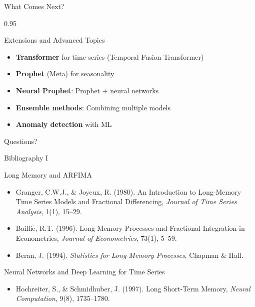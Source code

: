 \documentclass[9pt, aspectratio=169, t]{beamer}
\begin{document}
\begin{frame}{What Comes Next?}
    \begin{cminipage}{0.95\textwidth}
    \begin{block}{Extensions and Advanced Topics}
        \begin{itemize}\setlength{\itemsep}{0pt}
            \item \textbf{Transformer} for time series (Temporal Fusion Transformer)
            \item \textbf{Prophet} (Meta) for seasonality
            \item \textbf{Neural Prophet}: Prophet + neural networks
            \item \textbf{Ensemble methods}: Combining multiple models
            \item \textbf{Anomaly detection} with ML
        \end{itemize}
    \end{block}

    \vspace{0.1cm}

    \begin{center}
        \Large\textcolor{MainBlue}{Questions?}
    \end{center}
    \end{cminipage}
\end{frame}


\begin{frame}{Bibliography I}
    \begin{block}{Long Memory and ARFIMA}
        {\small
        \begin{itemize}\setlength{\itemsep}{0pt}
            \item Granger, C.W.J., \& Joyeux, R. (1980). An Introduction to Long-Memory Time Series Models and Fractional Differencing, \textit{Journal of Time Series Analysis}, 1(1), 15--29.
            \item Baillie, R.T. (1996). Long Memory Processes and Fractional Integration in Econometrics, \textit{Journal of Econometrics}, 73(1), 5--59.
            \item Beran, J. (1994). \textit{Statistics for Long-Memory Processes}, Chapman \& Hall.
        \end{itemize}
        }
    \end{block}

    \begin{exampleblock}{Neural Networks and Deep Learning for Time Series}
        {\small
        \begin{itemize}\setlength{\itemsep}{0pt}
            \item Hochreiter, S., \& Schmidhuber, J. (1997). Long Short-Term Memory, \textit{Neural Computation}, 9(8), 1735--1780.
        \end{itemize}
        }
    \end{exampleblock}
\end{frame}
\end{document}
